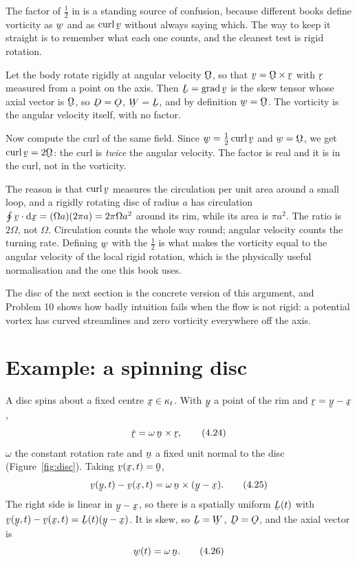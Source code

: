 \begin{remark}\label{rem:halfcurl}
The factor of $\tfrac12$ in  is a standing source of confusion,
because different books define vorticity as $\bw$ and as $\crl\bv$ without
always saying which. The way to keep it straight is to remember what each
one counts, and the cleanest test is rigid rotation.

Let the body rotate rigidly at angular velocity $\bOm$, so that
$\bv=\bOm\times\br$ with $\br$ measured from a point on the axis. Then
$\bL=\grad\bv$ is the skew tensor whose axial vector is $\bOm$, so
$\bD=\Ob$, $\bW=\bL$, and by definition $\bw=\bOm$. The vorticity is the
angular velocity itself, with no factor.

Now compute the curl of the same field. Since $\bw=\tfrac12\crl\bv$ and
$\bw=\bOm$, we get $\crl\bv=2\bOm$: the curl is \emph{twice} the angular
velocity. The factor is real and it is in the curl, not in the vorticity.

The reason is that $\crl\bv$ measures the circulation per unit area around
a small loop, and a rigidly rotating disc of radius $a$ has circulation
$\oint\ip\bv{\dl\bx}=(\Omega a)(2\pi a)=2\pi\Omega a^{2}$ around its rim,
while its area is $\pi a^{2}$. The ratio is $2\Omega$, not $\Omega$.
Circulation counts the whole way round; angular velocity counts the
turning rate. Defining $\bw$ with the $\tfrac12$ is what makes the
vorticity equal to the angular velocity of the local rigid rotation, which
is the physically useful normalisation and the one this book uses.

The disc of the next section is the concrete version of this argument, and
Problem 10 shows how badly intuition fails when the flow is not rigid: a
potential vortex has curved streamlines and zero vorticity everywhere off
the axis.
\end{remark}

\section{Example: a spinning disc}\label{sec:disc}

A disc spins about a fixed centre $\bx\in\kappa_{t}$. With $\by$ a point
of the rim and $\br=\by-\bx$,
\begin{equation}
   \dot\br=\omega\,\bn\times\br ,
   \tag{4.24}\label{eq:4.24}
\end{equation}
$\omega$ the constant rotation rate and $\bn$ a fixed unit normal to the
disc (Figure~\ref{fig:disc}). Taking $\bv(\bx,t)=\bze$,
\begin{equation}
   \bv(\by,t)-\bv(\bx,t)=\omega\,\bn\times(\by-\bx).
   \tag{4.25}\label{eq:4.25}
\end{equation}
The right side is linear in $\by-\bx$, so there is a spatially uniform
$\bL(t)$ with $\bv(\by,t)-\bv(\bx,t)=\bL(t)(\by-\bx)$. It is skew, so
$\bL=\bW$, $\bD=\Ob$, and the axial vector is
\begin{equation}
   \bw(t)=\omega\,\bn .
   \tag{4.26}\label{eq:4.26}
\end{equation}

